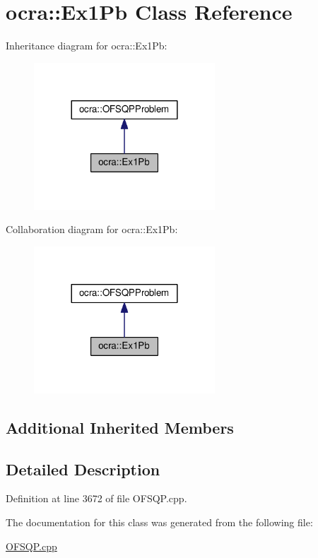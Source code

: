 \hypertarget{classocra_1_1Ex1Pb}{}\section{ocra\+:\+:Ex1\+Pb Class Reference}
\label{classocra_1_1Ex1Pb}


Inheritance diagram for ocra\+:\+:Ex1\+Pb\+:
\nopagebreak
\begin{figure}[H]
\begin{center}
\leavevmode
\includegraphics[width=192pt]{d4/d61/classocra_1_1Ex1Pb__inherit__graph}
\end{center}
\end{figure}


Collaboration diagram for ocra\+:\+:Ex1\+Pb\+:
\nopagebreak
\begin{figure}[H]
\begin{center}
\leavevmode
\includegraphics[width=192pt]{de/d6c/classocra_1_1Ex1Pb__coll__graph}
\end{center}
\end{figure}
\subsection*{Additional Inherited Members}


\subsection{Detailed Description}


Definition at line 3672 of file O\+F\+S\+Q\+P.\+cpp.



The documentation for this class was generated from the following file\+:\begin{DoxyCompactItemize}
\item 
\hyperlink{OFSQP_8cpp}{O\+F\+S\+Q\+P.\+cpp}\end{DoxyCompactItemize}
